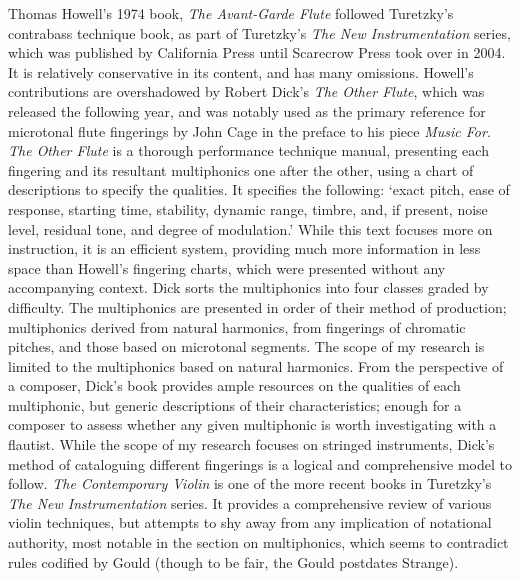 Thomas Howell’s 1974 book, \textit{The Avant-Garde Flute} followed Turetzky’s contrabass technique book, as part of Turetzky’s \emph{The New Instrumentation} series, which was published by California Press until Scarecrow Press took over in 2004.\autocite[4]{fallowfieldCelloMapHandbook2009} 
It is relatively conservative in its content, and has many omissions. 
Howell’s contributions are overshadowed by Robert Dick’s \emph{The Other Flute}, which was released the following year, and was notably used as the primary reference for microtonal flute fingerings by John Cage in the preface to his piece \emph{Music For}.\autocite{cageMusicPartsVoice1984} 
\emph{The Other Flute} is a thorough performance technique manual, presenting each fingering and its resultant multiphonics one after the other, using a chart of descriptions to specify the qualities.\autocite[86-135]{dickOtherFlute1989} 
It specifies the following: ‘exact pitch, ease of response, starting time, stability, dynamic range, timbre, and, if present, noise level, residual tone, and degree of modulation.’\autocite[84]{dickOtherFlute1989} 
While this text focuses more on instruction, it is an efficient system, providing much more information in less space than Howell’s fingering charts, which were presented without any accompanying context. 
Dick sorts the multiphonics into four classes graded by difficulty. The multiphonics are presented in order of their method of production; multiphonics derived from natural harmonics, from fingerings of chromatic pitches, and those based on microtonal segments. 
The scope of my research is limited to the multiphonics based on natural harmonics. 
From the perspective of a composer, Dick’s book provides ample resources on the qualities of each multiphonic, but generic descriptions of their characteristics; enough for a composer to assess whether any given multiphonic is worth investigating with a flautist. 
While the scope of my research focuses on stringed instruments, Dick’s method of cataloguing different fingerings is a logical and comprehensive model to follow.
\emph{The Contemporary Violin} is one of the more recent books in Turetzky’s \emph{The New Instrumentation} series.\autocite[]{strangeContemporaryViolinExtended2001} 
It provides a comprehensive review of various violin techniques, but attempts to shy away from any implication of notational authority, most notable in the section on multiphonics, which seems to contradict rules codified by Gould (though to be fair, the Gould postdates Strange).\autocites[134]{strangeContemporaryViolinExtended2001}[257-258]{gouldBars2011} 
